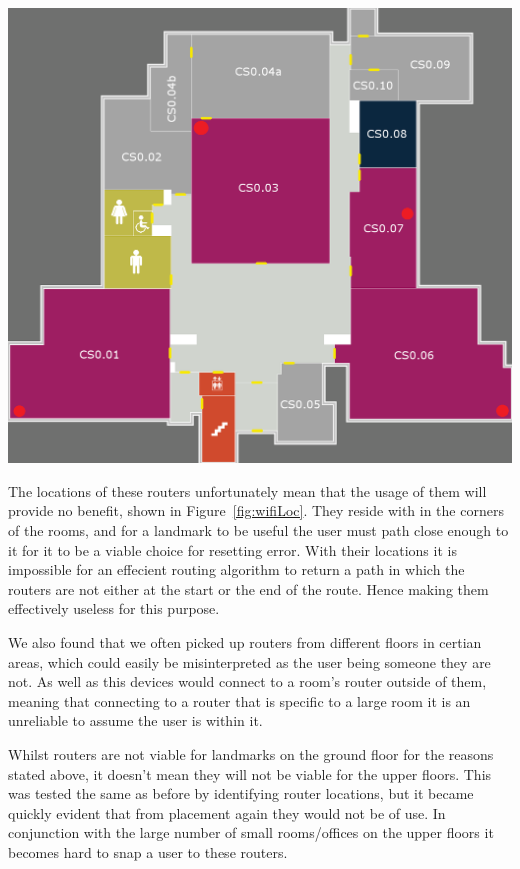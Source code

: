 \documentclass[main.tex]{subfiles}
\begin{document}
\begin{center}
\includegraphics[scale=0.3]{images-implementation/wifiLocation.png}
\label{fig:wifiLoc}
\end{center}

The locations of these routers unfortunately mean that the usage of them will provide no benefit, shown in Figure~\ref{fig:wifiLoc}. They reside with in the corners of the rooms, and for a landmark to be useful the user must path close enough to it for it to be a viable choice for resetting error. With their locations it is impossible for an effecient routing algorithm to return a path in which the routers are not either at the start or the end of the route. Hence making them effectively useless for this purpose.

We also found that we often picked up routers from different floors in certian areas, which could easily be misinterpreted as the user being someone they are not. As well as this devices would connect to a room's router outside of them, meaning that connecting to a router that is specific to a large room it is an unreliable to assume the user is within it.

Whilst routers are not viable for landmarks on the ground floor for the reasons stated above, it doesn't mean they will not be viable for the upper floors. This was tested the same as before by identifying router locations, but it became quickly evident that from placement again they would not be of use. In conjunction with the large number of small rooms/offices on the upper floors it becomes hard to snap a user to these routers.
\end{document}
